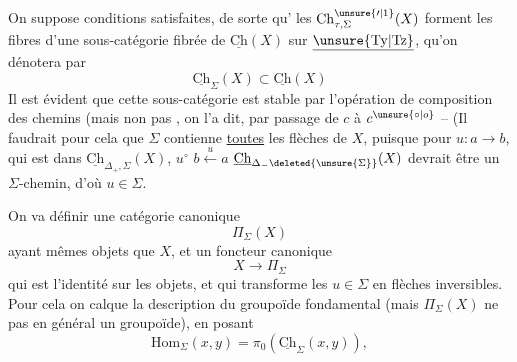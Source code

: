 On suppose  conditions satisfaites, de sorte qu'  les $\mathrm{Ch}_{\tau,\Sigma}^{\unsure{\prime|1}}(X)$ forment les fibres d'une sous-catégorie fibrée  de $\underline{\mathrm{Ch}}(X)$ sur $\underline{\unsure{\mathrm{Ty}|\mathrm{Tz}}}$, qu'on dénotera par
\[\underline{\mathrm{Ch}}_\Sigma(X)\subset\underline{\mathrm{Ch}}(X)\]
Il est évident que cette sous-catégorie est stable par l'opération de composition des chemins (mais non pas , on l'a dit, par passage de $c$ à $c^{\unsure{\circ|o}}$ -- (Il faudrait pour cela que $\Sigma$ contienne \uline{toutes} les flèches de $X$, puisque pour  $u:a\longrightarrow b$, qui est  dans $\underline{\mathrm{Ch}}_{\Delta_+,\Sigma}(X)$, $u^\circ$  $b\xleftarrow{u}a$  $\underline{\mathrm{Ch}}_{\Delta_-\deleted{\unsure{\Sigma}}}(X)$ devrait être un $\Sigma$-chemin, d'où $u\in\Sigma$.

On va définir une catégorie canonique
\[\Pi_\Sigma(X)\]
ayant mêmes objets que $X$, et un foncteur canonique
\[X\longrightarrow\Pi_\Sigma\]
 qui est l'identité sur les objets, et qui transforme les $u\in\Sigma$ en flèches inversibles. Pour cela on calque la  description du groupoïde fondamental (mais $\Pi_\Sigma(X)$ ne  pas en général un groupoïde), en posant
\[\mathrm{Hom}_\Sigma(x,y)=\pi_0(\underline{\mathrm{Ch}}_\Sigma(x,y)),\]
